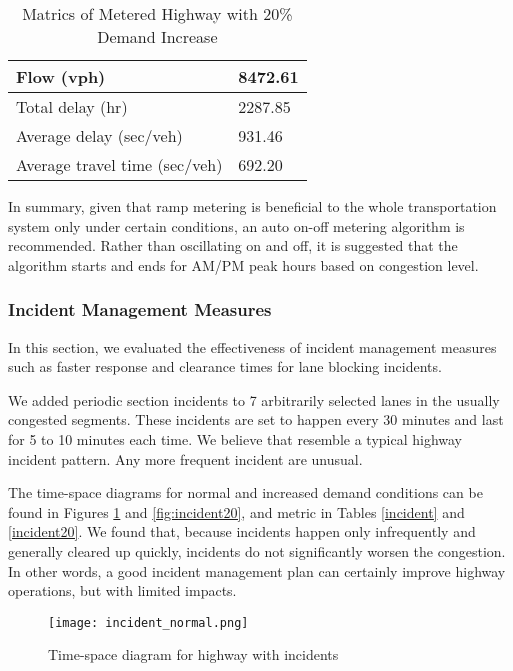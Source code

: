 \documentclass{article}
\begin{document}
\begin{table}[]
\centering
\caption{Matrics of Metered Highway with 20\% Demand Increase}
\begin{tabular}{|l|l|}
\hline
Flow (vph)                    & 8472.61 \\ \hline
Total delay (hr)              & 2287.85 \\ \hline
Average delay (sec/veh)       & 931.46  \\ \hline
Average travel time (sec/veh) & 692.20  \\ \hline
\end{tabular}
\label{metered20}
\end{table}

In summary, given that ramp metering is beneficial to the whole transportation system only under certain conditions, an auto on-off metering algorithm is recommended. Rather than oscillating on and off, it is suggested that the algorithm starts and ends for AM/PM peak hours based on congestion level.


\subsubsection{Incident Management Measures}
In this section, we evaluated the effectiveness of incident management measures such as faster response and clearance times for lane blocking incidents.

We added periodic section incidents to 7 arbitrarily selected lanes in the usually congested segments. These incidents are set to happen every 30 minutes and last for 5 to 10 minutes each time. We believe that resemble a typical highway incident pattern. Any more frequent incident are unusual.

The time-space diagrams for normal and increased demand conditions can be found in Figures \ref{fig:incident} and \ref{fig:incident20}, and metric in Tables \ref{incident} and \ref{incident20}. We found that, because incidents happen only infrequently and generally cleared up quickly, incidents do not significantly worsen the congestion. In other words, a good incident management plan can certainly improve highway operations, but with limited impacts.

\begin{figure}
    \centering
    \texttt{[image: incident\_normal.png]}
    \caption{Time-space diagram for highway with incidents}
    \label{fig:incident}
\end{figure}
\end{document}
